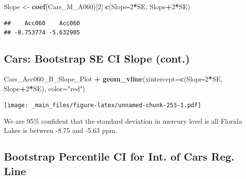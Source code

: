 \documentclass[]{book}
\newenvironment{Shaded}{\begin{snugshade}}{\end{snugshade}}
\newcommand{\KeywordTok}[1]{\textcolor[rgb]{0.13,0.29,0.53}{\textbf{#1}}}
\newcommand{\DataTypeTok}[1]{\textcolor[rgb]{0.13,0.29,0.53}{#1}}
\newcommand{\DecValTok}[1]{\textcolor[rgb]{0.00,0.00,0.81}{#1}}
\newcommand{\FloatTok}[1]{\textcolor[rgb]{0.00,0.00,0.81}{#1}}
\newcommand{\StringTok}[1]{\textcolor[rgb]{0.31,0.60,0.02}{#1}}
\newcommand{\OperatorTok}[1]{\textcolor[rgb]{0.81,0.36,0.00}{\textbf{#1}}}
\newcommand{\NormalTok}[1]{#1}
\begin{document}
\begin{Shaded}
\begin{Highlighting}[]
\NormalTok{Slope <-}\StringTok{ }\KeywordTok{coef}\NormalTok{(Cars_M_A060)[}\DecValTok{2}\NormalTok{]}
\KeywordTok{c}\NormalTok{(Slope}\OperatorTok{-}\DecValTok{2}\OperatorTok{*}\NormalTok{SE, Slope}\OperatorTok{+}\DecValTok{2}\OperatorTok{*}\NormalTok{SE)}
\end{Highlighting}
\end{Shaded}

\begin{verbatim}
##    Acc060    Acc060 
## -8.753774 -5.632905
\end{verbatim}

\subsection{Cars: Bootstrap SE CI Slope
(cont.)}\label{cars-bootstrap-se-ci-slope-cont.}

\begin{Shaded}
\begin{Highlighting}[]
\NormalTok{Cars_Acc060_B_Slope_Plot  }\OperatorTok{+}\StringTok{ }\KeywordTok{geom_vline}\NormalTok{(}\DataTypeTok{xintercept=}\KeywordTok{c}\NormalTok{(Slope}\OperatorTok{-}\DecValTok{2}\OperatorTok{*}\NormalTok{SE, Slope}\OperatorTok{+}\DecValTok{2}\OperatorTok{*}\NormalTok{SE), }\DataTypeTok{color=}\StringTok{"red"}\NormalTok{) }
\end{Highlighting}
\end{Shaded}

\texttt{[image: \_main\_files/figure-latex/unnamed-chunk-253-1.pdf]}

We are 95\% confident that the standard deviation in mercury level is
all Florida Lakes is between -8.75 and -5.63 ppm.

\subsection{Bootstrap Percentile CI for Int. of Cars Reg.
Line}\label{bootstrap-percentile-ci-for-int.-of-cars-reg.-line}

\begin{Shaded}
\end{Shaded}
\end{document}
